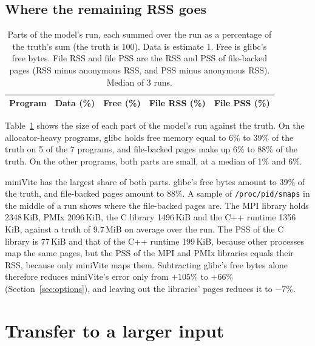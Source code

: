 \documentclass[11pt]{article}
\newcommand{\secref}[1]{Section~\ref{#1}}
\newcommand{\tabref}[1]{Table~\ref{#1}}
\begin{document}
\subsection{Where the remaining RSS goes}
\label{sec:gap}

\begin{table}[t]
\centering
\small
\caption{Parts of the model's run, each summed over the run as a percentage of the truth's sum (the truth is 100).
Data is estimate 1. Free is glibc's free bytes. File RSS and file PSS are the RSS and PSS of file-backed pages (RSS
minus anonymous RSS, and PSS minus anonymous RSS). Median of 3 runs.}
\label{tab:components}
\begin{tabular}{lrrrr}
\toprule
Program & Data (\%) & Free (\%) & File RSS (\%) & File PSS (\%) \\
\midrule

\bottomrule
\end{tabular}
\end{table}

\tabref{tab:components} shows the size of each part of the model's run against the truth. On the allocator-heavy
programs, glibc holds free memory equal to 6\% to 39\% of the truth on 5 of the 7 programs, and file-backed pages make
up 6\% to 88\% of the truth. On the other programs, both parts are small, at a median of 1\% and 6\%.

miniVite has the largest share of both parts. glibc's free bytes amount to 39\% of the truth, and file-backed pages
amount to 88\%. A sample of \texttt{/proc/pid/smaps} in the middle of a run shows where the file-backed pages are. The
MPI library holds 2348\,KiB, PMIx 2096\,KiB, the C library 1496\,KiB and the C++ runtime 1356\,KiB, against a truth of
9.7\,MiB on average over the run. The PSS of the C library is 77\,KiB and that of the C++ runtime 199\,KiB, because
other processes map the same pages, but the PSS of the MPI and PMIx libraries equals their RSS, because only miniVite
maps them. Subtracting glibc's free bytes alone therefore reduces miniVite's error only from $+105\%$ to $+66\%$
(\secref{sec:options}), and leaving out the libraries' pages reduces it to $-7\%$.

\section{Transfer to a larger input}
\label{sec:transfer}
\end{document}
